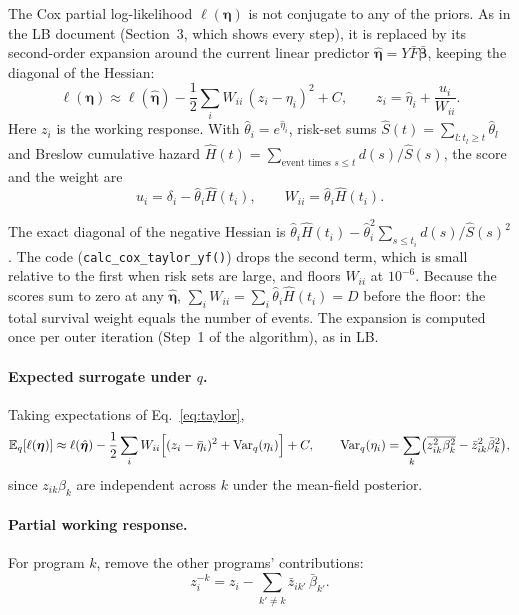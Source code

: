 \documentclass[11pt]{article}
\newcommand{\zbar}[2]{\bar{z}_{#1#2}}
\newcommand{\betabar}[1]{\bar{\beta}_{#1}}
\newcommand{\zsec}[2]{\overline{z^2_{#1#2}}}
\newcommand{\betasec}[1]{\overline{\beta^2_{#1}}}
\newcommand{\E}{\mathbb{E}_q}
\newcommand{\Var}{\mathrm{Var}_q}
\begin{document}
The Cox partial log-likelihood $\ell(\bm\eta)$ is not conjugate to any of the
priors. As in the LB document (Section~3, which shows every step), it is
replaced by its second-order expansion around the current linear predictor
$\hat{\bm\eta} = Y\bar F\bar{\bm\beta}$, keeping the diagonal of the Hessian:
\begin{equation}\label{eq:taylor}
  \ell(\bm\eta) \approx \ell(\hat{\bm\eta})
  - \frac12\sum_i W_{ii}\,(z_i - \eta_i)^2 + C,
  \qquad
  z_i = \hat\eta_i + \frac{u_i}{W_{ii}} .
\end{equation}
Here $z_i$ is the working response. With $\hat\theta_i = e^{\hat\eta_i}$, risk-set
sums $\hat S(t) = \sum_{l: t_l\ge t}\hat\theta_l$ and Breslow cumulative hazard
$\hat H(t) = \sum_{\text{event times } s\le t} d(s)/\hat S(s)$, the score and the
weight are
\begin{equation}\label{eq:uW}
  u_i = \delta_i - \hat\theta_i\hat H(t_i), \qquad
  W_{ii} = \hat\theta_i\hat H(t_i).
\end{equation}

\begin{codebox}
The exact diagonal of the negative Hessian is
$\hat\theta_i\hat H(t_i) - \hat\theta_i^2\sum_{s\le t_i} d(s)/\hat S(s)^2$. The
code (\texttt{calc\_cox\_taylor\_yf()}) drops the second term, which is small
relative to the first when risk sets are large, and floors $W_{ii}$ at $10^{-6}$.
Because the scores sum to zero at any $\hat{\bm\eta}$,
$\sum_i W_{ii} = \sum_i \hat\theta_i\hat H(t_i) = D$ before the floor: the total
survival weight equals the number of events. The expansion is computed once per
outer iteration (Step~1 of the algorithm), as in LB.
\end{codebox}

\paragraph{Expected surrogate under $q$.} Taking expectations of Eq.~\eqref{eq:taylor},
\begin{equation}\label{eq:surv-expect}
  \E[\ell(\bm\eta)] \approx \ell(\hat{\bm\eta})
  - \frac12\sum_i W_{ii}\Bigl[(z_i - \bar\eta_i)^2 + \Var(\eta_i)\Bigr] + C,
  \qquad
  \Var(\eta_i) = \sum_k\bigl(\zsec{i}{k}\betasec{k} - \zbar{i}{k}^2\betabar{k}^2\bigr),
\end{equation}
since $z_{ik}\beta_k$ are independent across $k$ under the mean-field posterior.

\paragraph{Partial working response.} For program $k$, remove the other programs'
contributions:
\begin{equation}\label{eq:zmk}
  z^{-k}_i = z_i - \sum_{k'\ne k}\zbar{i}{k'}\,\betabar{k'} .
\end{equation}
\end{document}
